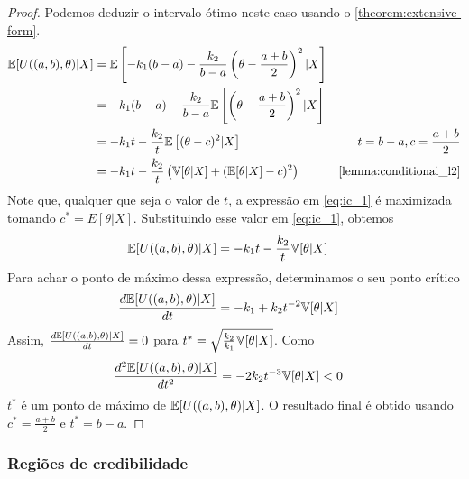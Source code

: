 \begin{proof}
 Podemos deduzir o intervalo ótimo neste caso 
 usando o \cref{theorem:extensive-form}.
 \begin{align}
  \label{eq:ic_1}
  \E[U((a,b),\theta)|X]	
  &= \E\left[-k_{1}(b-a)-\frac{k_{2}}{b-a}\left(\theta - \frac{a+b}{2}\right)^{2}|X\right]	\nonumber \\
  &= -k_{1}(b-a) -\frac{k_{2}}{b-a}\E\left[\left(\theta - \frac{a+b}{2}\right)^{2}|X\right]	\nonumber \\
  &= -k_{1}t -\frac{k_{2}}{t}\E\left[(\theta-c)^{2}|X\right]
  & t=b-a, c=\frac{a+b}{2} \nonumber \\
  &= -k_{1}t -\frac{k_{2}}{t}\left(\V[\theta|X]
  +(\E[\theta|X]-c)^{2}\right)
  & \text{\cref{lemma:conditional_l2}}
 \end{align}
 Note que, qualquer que seja o valor de $t$, 
 a expressão em \cref{eq:ic_1} é maximizada 
 tomando $c^{*}=E[\theta|X]$.
 Substituindo esse valor em \cref{eq:ic_1}, obtemos
 \begin{align*}
  {\mathbb E}[U((a,b),\theta)|X]	
  &= -k_{1}t -\frac{k_{2}}{t}{\mathbb V}[\theta|X]
 \end{align*}
 Para achar o ponto de máximo dessa expressão, 
 determinamos o seu ponto crítico
 \begin{align*}
  \frac{d{\mathbb E}[U((a,b),\theta)|X]}{dt}	
  &= -k_{1} +k_{2}t^{-2}{\mathbb V}[\theta|X]
 \end{align*}
 Assim, $\frac{d{\mathbb E}[U((a,b),\theta)|X]}{dt}=0$ para 
 $t^{*} = \sqrt{\frac{k_2}{k_1}{\mathbb V}[\theta|X]}$.
 Como
 \begin{align*}
  \frac{d^{2}{\mathbb E}[U((a,b),\theta)|X]}{dt^{2}} 
  &= -2k_{2}t^{-3}{\mathbb V}[\theta|X] < 0
 \end{align*}
 $t^{*}$ é um ponto de máximo de 
 ${\mathbb E}[U((a,b),\theta)|X]$.
 O resultado final é obtido usando 
 $c^{*}=\frac{a+b}{2}$ e $t^{*}=b-a$.
\end{proof}

\subsubsection{Regiões de credibilidade}

